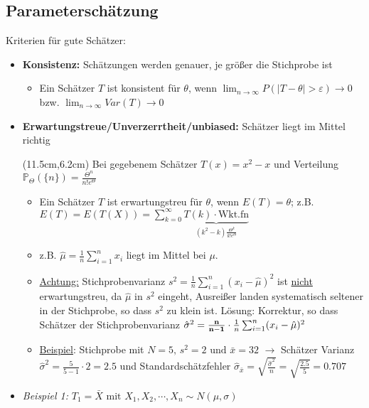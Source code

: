 \subsection{Parameterschätzung}

Kriterien für gute Schätzer:
\begin{itemize}
    \item \textbf{Konsistenz:} Schätzungen werden genauer, je größer die Stichprobe ist
    \begin{itemize}
        \item Ein Schätzer \(T\) ist konsistent für \(\theta\), wenn \(\lim_{n\rightarrow\infty}P(|T-\theta|>\varepsilon)\rightarrow 0\) bzw. \(\lim_{n\rightarrow\infty}Var(T)\rightarrow 0\)
    \end{itemize}
    \item \textbf{Erwartungstreue/Unverzerrtheit/unbiased:} Schätzer liegt im Mittel richtig
    \begin{textblock*}{5cm}(11.5cm,6.2cm) %
        \footnotesize{Bei gegebenem Schätzer \(T(x)=x^2-x\) und Verteilung \(\mathbb{P}_\Theta(\{n\})=\frac{\Theta^n}{n!e^\Theta}\)}
     \end{textblock*}
    \begin{itemize}
        \item Ein Schätzer \(T\) ist erwartungstreu für \(\theta\), wenn \(E(T)=\theta\); z.B. \(E(T)=E(T(X))=\sum_{k=0}^{\infty}\underbrace{T(k)\cdot\text{Wkt.fn}}_{(k^2-k)\frac{\Theta^k}{k!e^\Theta}}\)
        \item z.B. \(\hat{\mu}=\frac{1}{n}\sum_{i=1}^{n}x_i\) liegt im Mittel bei \(\mu\). 
        \item \underline{Achtung:} Stichprobenvarianz \(s^2=\frac{1}{n}\sum_{i=1}^{n}(x_i-\hat{\mu})^2\) ist \underline{nicht} erwartungstreu, da \(\hat{\mu}\) in \(s^2\) eingeht, Ausreißer landen systematisch seltener in der Stichprobe, so dass \(s^2\) zu klein ist. Lösung: Korrektur, so dass Schätzer der Stichprobenvarianz \(\hat{\sigma}^2=\bold{\frac{n}{n-1}}\cdot\frac{1}{n}\sum_{i=1}^{n}(x_i-\hat{\mu})^2\)
        \item \underline{Beispiel}: Stichprobe mit \(N=5\text{, }s^2=2 \text{ und } \bar{x}=32\) \(\rightarrow\) Schätzer Varianz \(\hat{\sigma}^2=\frac{5}{5-1}\cdot 2=2.5\) und Standardschätzfehler \(\hat{\sigma}_{\bar{x}}=\sqrt{\frac{\hat{\sigma}^2}{n}}=\sqrt{\frac{2.5}{5}}=0.707\)
    \end{itemize}
    \item \emph{Beispiel 1:} \(T_1=\bar{X}\text{ mit }X_1, X_2, \cdots, X_n\sim N(\mu, \sigma)\)

\end{itemize}
